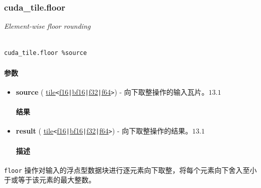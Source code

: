 \documentclass{article}
\begin{document}
\subsubsection{cuda\_tile.floor}


\textit{Element-wise floor rounding}




\begin{lstlisting}

cuda_tile.floor %source

\end{lstlisting}



\paragraph{参数}


\begin{itemize}
\item \textbf{source} ( \href{https://docs.nvidia.com/cuda/tile-ir/latest/sections/types.html#type-tile}{tile}\texttt{<}\href{https://docs.nvidia.com/cuda/tile-ir/latest/sections/types.html#subsection-element-types}{f16}\texttt{|}\href{https://docs.nvidia.com/cuda/tile-ir/latest/sections/types.html#subsection-element-types}{bf16}\texttt{|}\href{https://docs.nvidia.com/cuda/tile-ir/latest/sections/types.html#subsection-element-types}{f32}\texttt{|}\href{https://docs.nvidia.com/cuda/tile-ir/latest/sections/types.html#subsection-element-types}{f64}\texttt{>}) - 向下取整操作的输入瓦片。$\boxed{13.1}$




\paragraph{结果}


\item \textbf{result} ( \href{https://docs.nvidia.com/cuda/tile-ir/latest/sections/types.html#type-tile}{tile}\texttt{<}\href{https://docs.nvidia.com/cuda/tile-ir/latest/sections/types.html#subsection-element-types}{f16}\texttt{|}\href{https://docs.nvidia.com/cuda/tile-ir/latest/sections/types.html#subsection-element-types}{bf16}\texttt{|}\href{https://docs.nvidia.com/cuda/tile-ir/latest/sections/types.html#subsection-element-types}{f32}\texttt{|}\href{https://docs.nvidia.com/cuda/tile-ir/latest/sections/types.html#subsection-element-types}{f64}\texttt{>}) - 向下取整操作的结果。$\boxed{13.1}$




\paragraph{描述}


\end{itemize}
\texttt{floor} 操作对输入的浮点型数据块进行逐元素向下取整，将每个元素向下舍入至小于或等于该元素的最大整数。
\end{document}
